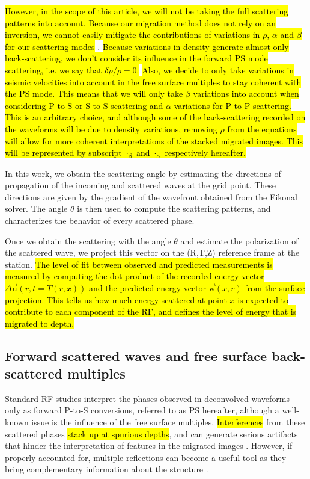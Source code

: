 \documentclass[10pt,a4paper]{article}
\begin{document}
\hl{However, in the scope of this article, we will not be taking the full scattering patterns into account.
Because our migration method does not rely on an inversion, we cannot easily mitigate the contributions of variations in $\rho$, $\alpha$ and $\beta$ for our scattering modes} \citep{cheng_gji_16}.
\hl{Because variations in density generate almost only back-scattering, we don't consider its influence in the forward PS mode scattering, i.e. we say that $\delta\rho / \rho = 0$.}
\hl{Also, we decide to only take variations in seismic velocities into account in the free surface multiples to stay coherent with the PS mode.
This means that we will only take $\beta$ variations into account when considering P-to-S or S-to-S scattering and $\alpha$ variations for P-to-P scattering.
This is an arbitrary choice, and although some of the back-scattering recorded on the waveforms will be due to density variations, removing $\rho$ from the equations will allow for more coherent interpretations of the stacked migrated images.
This will be represented by subscript $\cdot_{\beta}$ and $\cdot_{\alpha}$ respectively hereafter.}

In this work, we obtain the scattering angle by estimating the directions of propagation of the incoming and scattered waves at the grid point.
These directions are given by the gradient of the wavefront obtained from the Eikonal solver.
The angle $\theta$ is then used to compute the scattering patterns, and characterizes the behavior of every scattered phase.

Once we obtain the scattering with the angle $\theta$ and estimate the polarization of the scattered wave, we project this vector on the (R,T,Z) reference frame at the station.
\hl{The level of fit between observed and predicted measurements is measured by computing the dot product of the recorded energy vector $\Delta\vec{\text{u}}(r,t=T(r,x))$ and the predicted energy vector $\vec{\text{w}}(x,r)$ from the surface projection. 
This tells us how much energy scattered at point $x$ is expected to contribute to each component of the RF, and defines the level of energy that is migrated to depth.}

\subsection{Forward scattered waves and free surface back-scattered multiples}

Standard RF studies interpret the phases observed in deconvolved waveforms only as forward P-to-S conversions, referred to as PS hereafter, although a well-known issue is the influence of the free surface multiples.
\hl{Interferences} from these scattered phases \hl{stack up at spurious depths}, and can generate serious artifacts that hinder the interpretation of features in the migrated images \citep{cheng_grl_17}.
However, if properly accounted for, multiple reflections can become a useful tool as they bring complementary information about the structure \citep{tauz_epsl_16}. 
\end{document}
